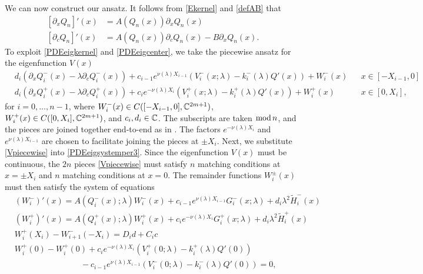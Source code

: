 \documentclass[12pt]{elsarticle}
\theoremstyle{plain}
\theoremstyle{definition}
\theoremstyle{remark}
\numberwithin{theorem}{section}
\numberwithin{equation}{section}
\begin{document}
We can now construct our ansatz. It follows from \cref{Ekernel} and \cref{defAB} that
\begin{equation}\label{PDEeigkernel}
\begin{aligned}
{[\partial_x Q_n]}'(x) &= A(Q_n(x))\partial_x Q_n(x) \\
{[\partial_c Q_n]}'(x) &= A(Q_n(x))\partial_c Q_n(x) - B \partial_x Q_n(x).
\end{aligned}
\end{equation}
To exploit \cref{PDEeigkernel} and \cref{PDEeigcenter}, we take the piecewise ansatz for the eigenfunction $V(x)$
\begin{equation}\label{Vpiecewise}
\begin{aligned}
&d_i (\partial_x Q_i^-(x) - \lambda \partial_c Q_i^-(x)) + c_{i-1} e^{\nu(\lambda)X_{i-1} }( V_i^-(x; \lambda) - k_i^-(\lambda) Q'(x) ) + W_i^-(x) && x \in [-X_{i-1}, 0] \\
&d_i (\partial_x Q_i^+(x) - \lambda \partial_c Q_i^+(x)) + c_i e^{-\nu(\lambda)X_i }( V_i^+(x; \lambda) - k_i^+(\lambda) Q'(x) ) + W_i^+(x) && x \in [0, X_i],
\end{aligned}
\end{equation}
for $i = 0, \dots, n-1$, where $W_i^-(x) \in C([-X_{i-1}, 0], \mathbb{C}^{2m+1})$, $W_i^+(x) \in C([0, X_i], \mathbb{C}^{2m+1})$, and $c_i, d_i \in \mathbb{C}$. The subscripts are taken $\mathop\mathrm{mod}\nolimits n$, and the pieces are joined together end-to-end as in \cite{Sandstede1998}. The factors $e^{-\nu(\lambda)X_i}$ and $e^{\nu(\lambda)X_{i-1}}$ are chosen to facilitate joining the pieces at $\pm X_i$. Next, we substitute \cref{Vpiecewise} into \cref{PDEeigsystemper3}. Since the eigenfunction $V(x)$ must be continuous, the $2n$ pieces \cref{Vpiecewise} must satisfy $n$ matching conditions at $x = \pm X_i$ and $n$ matching conditions at $x = 0$. The remainder functions $W_i^\pm(x)$ must then satisfy the system of equations
\begin{equation}\label{eigsystem0}
\begin{aligned}
&(W_i^-)'(x) = A(Q_i^-(x); \lambda) W_i^-(x) + c_{i-1} e^{\nu(\lambda)X_{i-1}}  G_i^-(x; \lambda) + d_i \lambda^2 \tilde{H}_i^-(x) \\
&(W_i^+)'(x) = A(Q_i^+(x); \lambda) W_i^+(x) + c_i e^{-\nu(\lambda)X_i} G_i^+(x; \lambda) + d_i \lambda^2 \tilde{H}_i^+(x) \\
&W_i^+(X_i) - W_{i+1}^-(-X_i) = D_i d + C_i c \\
&W_i^+(0) - W_i^+(0) + c_i e^{-\nu(\lambda)X_i}(V_i^+(0; \lambda) - k_i^+(\lambda) Q'(0) )\\
&\qquad\qquad\qquad\qquad - c_{i-1} e^{\nu(\lambda)X_{i-1}} ( V_i^-(0; \lambda) - k_i^-(\lambda) Q'(0) ) = 0,
\end{aligned}
\end{equation}
\end{document}
